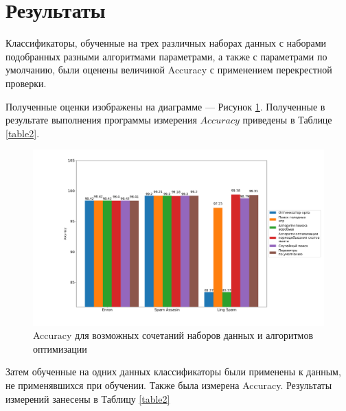 \section{Результаты}

Классификаторы, обученные на трех различных наборах данных с наборами подобранных разными алгоритмами параметрами, а 
также с параметрами по умолчанию, были оценены величиной Accuracy с применением перекрестной проверки.

Полученные оценки изображены на диаграмме — Рисунок \ref{CrossValAcc}. 
Полученные в результате выполнения программы измерения $Accuracy$ приведены в Таблице \ref{table2}. 

\begin{figure}[H]
    \centering
    \includegraphics[width=165mm]{static/cross-val-acc.png}
    \caption{Accuracy для возможных сочетаний наборов данных и алгоритмов оптимизации}
    \label{CrossValAcc}
\end{figure}

Затем обученные на одних данных классификаторы были применены к данным, не применявшихся при обучении. Также была 
измерена Accuracy. Результаты измерений занесены в Таблицу \ref{table2}

